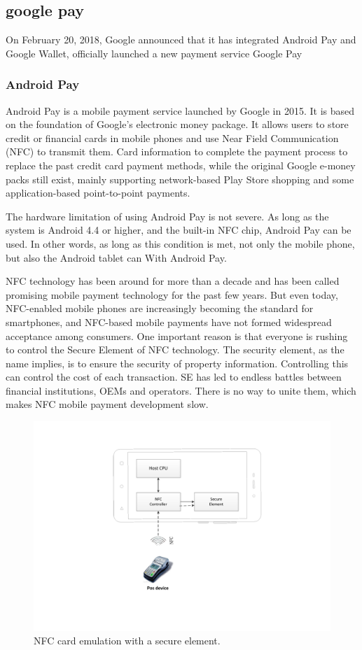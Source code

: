 \documentclass[journal]{IEEEtran}
\begin{document}
\subsection{google pay}
On February 20, 2018, Google announced that it has integrated Android Pay and Google Wallet, officially launched a new payment service Google Pay

\subsubsection{Android Pay}Android Pay is a mobile payment service launched by Google in 2015. It is based on the foundation of Google's electronic money package. It allows users to store credit or financial cards in mobile phones and use Near Field Communication (NFC) to transmit them. Card information to complete the payment process to replace the past credit card payment methods, while the original Google e-money packs still exist, mainly supporting network-based Play Store shopping and some application-based point-to-point payments.

The hardware limitation of using Android Pay is not severe. As long as the system is Android 4.4 or higher, and the built-in NFC chip, Android Pay can be used. In other words, as long as this condition is met, not only the mobile phone, but also the Android tablet can With Android Pay.


NFC technology has been around for more than a decade and has been called promising mobile payment technology for the past few years. But even today, NFC-enabled mobile phones are increasingly becoming the standard for smartphones, and NFC-based mobile payments have not formed widespread acceptance among consumers. One important reason is that everyone is rushing to control the Secure Element of NFC technology. The security element, as the name implies, is to ensure the security of property information. Controlling this can control the cost of each transaction. SE has led to endless battles between financial institutions, OEMs and operators. There is no way to unite them, which makes NFC mobile payment development slow.

\begin{figure}[htbp]
\centerline{\includegraphics[scale=0.6]{NFC_se.pdf}}
\caption{NFC card emulation with a secure element.}
\label{fig}
\end{figure}
\end{document}
